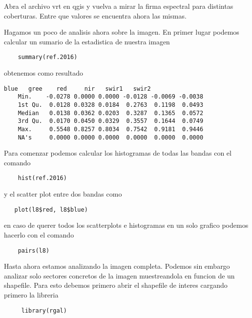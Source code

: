 \begin{act} 
   Abra el archivo vrt en qgis y vuelva a mirar la firma espectral para 
   distintas coberturas. Entre que valores se encuentra ahora las mismas.
\end{act}

\begin{exa}

    Hagamos un poco de analisis ahora sobre la imagen. En primer lugar podemos
    calcular un sumario de la estadistica de nuestra imagen
    \begin{lstlisting}
    summary(ref.2016)   
    \end{lstlisting}
    obtenemos como resultado
    \begin{Verbatim}[fontsize=\small]
               blue   gree    red     nir   swir1   swir2
    Min.    -0.0278 0.0000 0.0000 -0.0128 -0.0069 -0.0038
    1st Qu.  0.0128 0.0328 0.0184  0.2763  0.1198  0.0493
    Median   0.0138 0.0362 0.0203  0.3287  0.1365  0.0572
    3rd Qu.  0.0170 0.0450 0.0329  0.3557  0.1644  0.0749
    Max.     0.5548 0.8257 0.8034  0.7542  0.9181  0.9446
    NA's     0.0000 0.0000 0.0000  0.0000  0.0000  0.0000
    \end{Verbatim}
    Para comenzar podemos calcular los histogramas de todas las bandas con el 
    comando
    \begin{lstlisting}
    hist(ref.2016) 
    \end{lstlisting}

y el scatter plot entre dos bandas como

\begin{lstlisting}
   plot(l8$red, l8$blue)    
\end{lstlisting}

en caso de querer todos los scatterplots e histogramas en un solo grafico
podemos hacerlo con el comando

\begin{lstlisting}
    pairs(l8)
\end{lstlisting}

Hasta ahora estamos analizando la imagen completa. Podemos sin embargo analizar
solo sectores concretos de la imagen muestreandola en funcion de un shapefile.
Para esto debemos primero abrir el shapefile de interes cargando primero la
libreria
\end{exa}

\begin{lstlisting}
     library(rgal)
\end{lstlisting}

